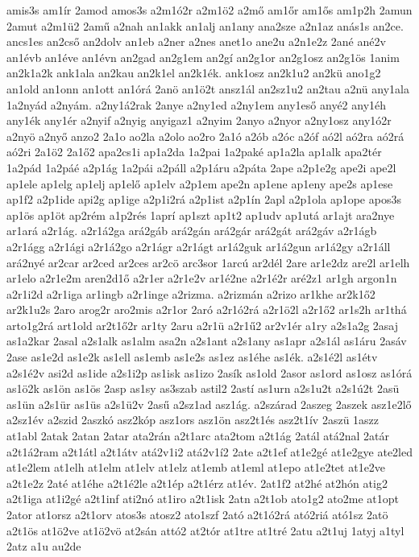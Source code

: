 {amis3s
am1ír
2amod
amos3s
a2m1ó2r
a2m1ö2
a2mő
am1őr
am1ős
am1p2h
2amun
2amut
a2m1ü2
2amű
a2nah
an1akk
an1alj
an1any
ana2sze
a2n1az
anás1s
an2ce.
ancs1es
an2cső
an2dolv
an1eb
a2ner
a2nes
anet1o
ane2u
a2n1e2z
2ané
ané2v
an1évb
an1éve
an1évn
an2gad
an2g1em
an2gí
an2g1or
an2g1osz
an2g1ös
1anim
an2k1a2k
ank1ala
an2kau
an2k1el
an2k1ék.
ank1osz
an2k1u2
an2kü
ano1g2
an1old
an1onn
an1ott
an1órá
2anö
an1ö2t
ansz1ál
an2sz1u2
an2tau
a2nü
any1ala
1a2nyád
a2nyám.
a2ny1á2rak
2anye
a2ny1ed
a2ny1em
any1eső
anyé2
any1éh
any1ék
any1ér
a2nyif
a2nyig
anyigaz1
a2nyim
2anyo
a2nyor
a2ny1osz
any1ó2r
a2nyö
a2nyő
anzo2
2a1o
ao2la
a2olo
ao2ro
2a1ó
a2ób
a2óc
a2óf
aó2l
aó2ra
aó2rá
aó2ri
2a1ö2
2a1ő2
apa2cs1i
ap1a2da
1a2pai
1a2paké
ap1a2la
ap1alk
apa2tér
1a2pád
1a2páé
a2p1ág
1a2pái
a2páll
a2p1áru
a2páta
2ape
a2p1e2g
ape2i
ape2l
ap1ele
ap1elg
ap1elj
ap1elő
ap1elv
a2p1em
ape2n
ap1ene
ap1eny
ape2s
ap1ese
ap1f2
a2p1ide
api2g
ap1ige
a2p1i2rá
a2p1ist
a2p1ín
2apl
a2p1ola
ap1ope
apos3s
ap1ös
ap1öt
ap2rém
a1p2rés
1aprí
ap1szt
ap1t2
ap1udv
ap1utá
ar1ajt
ara2nye
ar1ará
a2r1ág.
a2r1á2ga
ará2gáb
ará2gán
ará2gár
ará2gát
ará2gáv
a2r1ágb
a2r1ágg
a2r1ági
a2r1á2go
a2r1ágr
a2r1ágt
ar1á2guk
ar1á2gun
ar1á2gy
a2r1áll
ará2nyé
ar2car
ar2ced
ar2ces
ar2cö
arc3sor
1arcú
ar2dél
2are
ar1e2dz
are2l
ar1elh
ar1elo
a2r1e2m
aren2d1ő
a2r1er
a2r1e2v
ar1é2ne
a2r1é2r
aré2z1
ar1gh
argon1n
a2r1i2d
a2r1iga
ar1ingb
a2r1inge
a2rizma.
a2rizmán
a2rizo
ar1khe
ar2k1ő2
ar2k1u2s
2aro
arog2r
aro2mis
a2r1or
2aró
a2r1ó2rá
a2r1ö2l
a2r1ő2
ar1s2h
ar1thá
arto1g2rá
art1old
ar2t1ő2r
ar1ty
2aru
a2r1ü
a2r1ű2
ar2v1ér
a1ry
a2s1a2g
2asaj
as1a2kar
2asal
a2s1alk
as1alm
asa2n
a2s1ant
a2s1any
as1apr
a2s1ál
as1áru
2asáv
2ase
as1e2d
as1e2k
as1ell
as1emb
as1e2s
as1ez
as1éhe
as1ék.
a2s1é2l
as1étv
a2s1é2v
asi2d
as1ide
a2s1i2p
as1isk
as1izo
2asík
as1old
2asor
as1ord
as1osz
as1órá
as1ö2k
as1ön
as1ös
2asp
as1sy
as3szab
astil2
2astí
as1urn
a2s1u2t
a2s1ú2t
2asü
as1ün
a2s1ür
as1üs
a2s1ü2v
2asű
a2sz1ad
asz1ág.
a2szárad
2aszeg
2aszek
asz1e2lő
a2sz1év
a2szid
2aszkó
asz2kóp
asz1ors
asz1ön
asz2t1és
asz2t1ív
2aszü
1aszz
at1abl
2atak
2atan
2atar
ata2rán
a2t1arc
ata2tom
a2t1ág
2atál
atá2nal
2atár
a2t1á2ram
a2t1átl
a2t1átv
atá2v1i2
atá2v1í2
2ate
a2t1ef
at1e2gé
at1e2gye
ate2led
at1e2lem
at1elh
at1elm
at1elv
at1elz
at1emb
at1eml
at1epo
at1e2tet
at1e2ve
a2t1e2z
2até
at1éhe
a2t1é2le
a2t1ép
a2t1érz
at1év.
2at1f2
at2hé
at2hón
atig2
a2t1iga
at1i2gé
a2t1inf
ati2nó
at1iro
a2t1isk
2atn
a2t1ob
ato1g2
ato2me
at1opt
2ator
at1orsz
a2t1orv
atos3s
atosz2
ato1szf
2ató
a2t1ó2rá
ató2riá
ató1sz
2atö
a2t1ös
at1ö2ve
at1ö2vö
at2sán
attó2
at2tór
at1tre
at1tré
2atu
a2t1uj
1atyj
a1tyl
2atz
a1u
au2de
}
